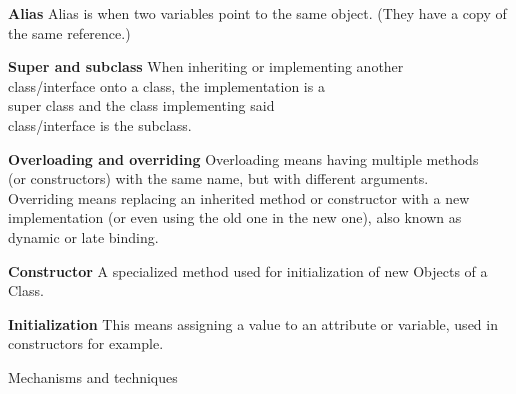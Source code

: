 \documentclass{article}
\begin{document}
\begin{Parallel}[v]{0.49\textwidth}{0.49\textwidth}
{        \textbf{Alias}\newline
        Alias is when two variables point to the same object.
        (They have a copy of the same reference.)
        \\

        \textbf{Super and subclass}\newline
        When inheriting or implementing another\\
        class/interface onto a class, the implementation is a\\
        super class and the class implementing said\\
        class/interface is the subclass.

        \textbf{Overloading and overriding}\newline
        Overloading means having multiple methods \\
        (or constructors) with the same name, but with different arguments.\\
        Overriding means replacing an inherited method or constructor with a new implementation
        (or even using the old one in the new one), also known as dynamic or late binding.

        \textbf{Constructor}\newline
        A specialized method used for initialization of new Objects of a Class.

        \textbf{Initialization}\newline
        This means assigning a value to an attribute or variable, used in constructors for example.
    }
    \ParallelPar
\end{Parallel}

\newpage
\begin{center}
    {\huge Mechanisms and techniques}
\end{center}
\end{document}
